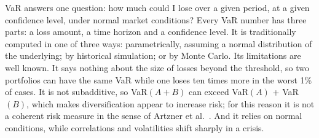 VaR answers one question: how much could I lose over a given period, at a given confidence level, under normal market conditions? Every VaR number has three parts: a loss amount, a time horizon and a confidence level. It is traditionally computed in one of three ways: parametrically, assuming a normal distribution of the underlying; by historical simulation; or by Monte Carlo. Its limitations are well known. It says nothing about the size of losses beyond the threshold, so two portfolios can have the same VaR while one loses ten times more in the worst 1\% of cases. It is not subadditive, so VaR$(A+B)$ can exceed VaR$(A)$ + VaR$(B)$, which makes diversification appear to increase risk; for this reason it is not a coherent risk measure in the sense of Artzner et al.~\cite{artzner1999}. And it relies on normal conditions, while correlations and volatilities shift sharply in a crisis.

